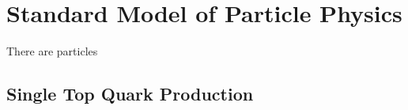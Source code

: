 \section{Standard Model of Particle Physics}
\label{sec:particles}
There are particles~\cite{pdg2010}

\subsection{Single Top Quark Production}
\label{ssec:singleT}